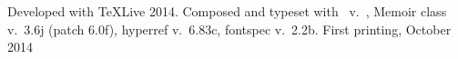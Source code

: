	\noindent
	{\unifont Developed with \TeX{}Live 2014. Composed and typeset with \XeLaTeX\ v.\ \the\XeTeXversion{}\XeTeXrevision{}, Memoir class v.\ 3.6j (patch 6.0f), hyperref v.\ 6.83c, fontspec v.\ 2.2b.  First printing, October 2014}

